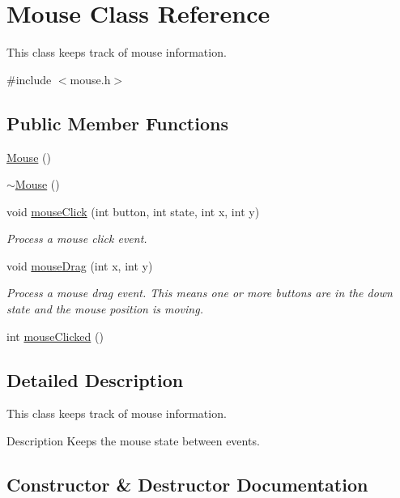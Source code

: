 \hypertarget{classMouse}{}\section{Mouse Class Reference}
\label{classMouse}


This class keeps track of mouse information.  




{\ttfamily \#include $<$mouse.\+h$>$}

\subsection*{Public Member Functions}
\begin{DoxyCompactItemize}
\item 
\hyperlink{classMouse_a99024d3700d649ae19c1537b42a3e86d}{Mouse} ()
\item 
\hyperlink{classMouse_afdf7d8abef29c10be77ead773f964f4f}{$\sim$\+Mouse} ()
\item 
void \hyperlink{classMouse_a7ae3c6b4663e01c939675b671a78b17e}{mouse\+Click} (int button, int state, int x, int y)
\begin{DoxyCompactList}\small\item\em Process a mouse click event. \end{DoxyCompactList}\item 
void \hyperlink{classMouse_ae8c7a78a1d2dd2e44eba6b3cce0ea915}{mouse\+Drag} (int x, int y)
\begin{DoxyCompactList}\small\item\em Process a mouse drag event. This means one or more buttons are in the down state and the mouse position is moving. \end{DoxyCompactList}\item 
int \hyperlink{classMouse_ac5364593f0ad7db9ba8f696273dbbbb4}{mouse\+Clicked} ()
\end{DoxyCompactItemize}


\subsection{Detailed Description}
This class keeps track of mouse information. 

\begin{DoxyParagraph}{Description}
Keeps the mouse state between events. 
\end{DoxyParagraph}


\subsection{Constructor \& Destructor Documentation}
\hypertarget{classMouse_a99024d3700d649ae19c1537b42a3e86d}{}
